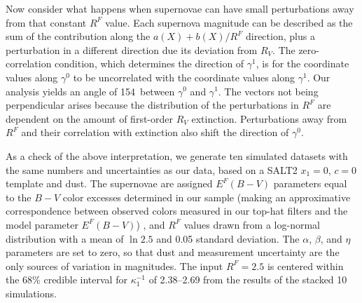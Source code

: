\documentclass{aastex61}   	%
\begin{document}
Now consider what happens when supernovae can have small  perturbations away from that constant $R^F$ value.  Each supernova magnitude
can be described as the sum of the contribution along the $a(X)+b(X)/R^F$ direction, plus a perturbation in a different direction due its deviation  from $R_V$.
The zero-correlation condition, which determines the direction of $\gamma^1$,  is for the coordinate values along $\gamma^0$ to be uncorrelated with the coordinate values along $\gamma^1$.
Our analysis yields an angle of 154\arcdeg\ between  $\gamma^0$ and $\gamma^1$.
The vectors not being perpendicular arises because the distribution of the perturbations in $R^F$ are dependent on the amount of first-order $R_V$ extinction.
Perturbations away from $R^F$ and their correlation with extinction also shift the direction of $\gamma^0$.


\color{orange}
As a check of the above interpretation, we generate ten simulated datasets with the same numbers and uncertainties as our data, based on a
SALT2 $x_1=0$, $c=0$ template and   dust.  The supernovae
are assigned $E^F(B-V)$ parameters equal to the $B-V$ color excesses determined in our sample
(making an approximative correspondence between observed colors measured in our top-hat filters and the 
model parameter $E^F(B-V)$) , and $R^F$ values drawn from a log-normal
distribution with a mean of $\ln{2.5}$ and 0.05 standard deviation.  The $\alpha$, $\beta$, and $\eta$ parameters are set to zero, so that dust and
measurement uncertainty are the only sources of variation in magnitudes.  The input $R^F=2.5$ is centered
within the 68\% credible interval for $\kappa^{-1}_1$ of 2.38--2.69 from the results of the stacked 10 simulations.

\color{black}
%
%
\end{document}
